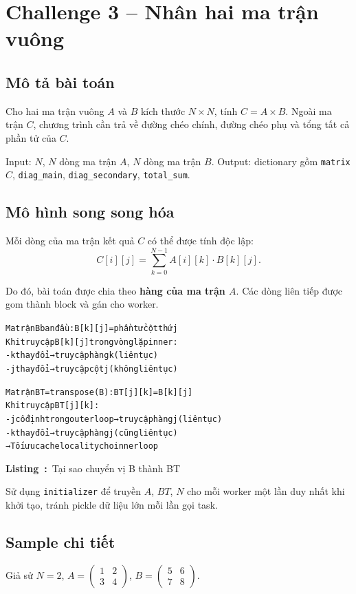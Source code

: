 \documentclass[12pt,a4paper]{article}
\newcounter{vietlisting}
\newenvironment{vietlisting}[1]{%
  \def\vietlistingcaption{#1}%
  \refstepcounter{vietlisting}%
  \begin{tcolorbox}[
    enhanced,
    breakable,
    colback=codebg,
    colframe=codeframe,
    boxrule=0.5pt,
    arc=1mm,
    left=6pt,
    right=6pt,
    top=6pt,
    bottom=4pt
  ]%
  \small\ttfamily\begin{alltt}
}{%
  \end{alltt}\normalfont
  \end{tcolorbox}%
  \begin{center}
    \small\textbf{Listing~\thevietlisting:}~\vietlistingcaption
  \end{center}
}
\begin{document}
\section{Challenge 3 -- Nhân hai ma trận vuông}

\subsection{Mô tả bài toán}

Cho hai ma trận vuông $A$ và $B$ kích thước $N \times N$, tính $C = A \times B$. Ngoài ma trận $C$, chương trình cần trả về đường chéo chính, đường chéo phụ và tổng tất cả phần tử của $C$.

Input: $N$, $N$ dòng ma trận $A$, $N$ dòng ma trận $B$. Output: dictionary gồm \texttt{matrix} $C$, \texttt{diag\_main}, \texttt{diag\_secondary}, \texttt{total\_sum}.

\subsection{Mô hình song song hóa}

Mỗi dòng của ma trận kết quả $C$ có thể được tính độc lập:
\[
C[i][j] = \sum_{k=0}^{N-1} A[i][k] \cdot B[k][j].
\]

Do đó, bài toán được chia theo \textbf{hàng của ma trận $A$}. Các dòng liên tiếp được gom thành block và gán cho worker.

\begin{vietlisting}{Tại sao chuyển vị B thành BT}
Ma trận B ban đầu: B[k][j] = phần tử cột thứ j
Khi truy cập B[k][j] trong vòng lặp inner:
  - k thay đổi → truy cập hàng k (liên tục)
  - j thay đổi → truy cập cột j (không liên tục)

Ma trận BT = transpose(B): BT[j][k] = B[k][j]
Khi truy cập BT[j][k]:
  - j cố định trong outer loop → truy cập hàng j (liên tục)
  - k thay đổi → truy cập hàng j (cũng liên tục)
  → Tối ưu cache locality cho inner loop
\end{vietlisting}

Sử dụng \texttt{initializer} để truyền $A$, $BT$, $N$ cho mỗi worker một lần duy nhất khi khởi tạo, tránh pickle dữ liệu lớn mỗi lần gọi task.

\subsection{Sample chi tiết}

Giả sử $N=2$, $A = \begin{pmatrix}1 & 2\\ 3 & 4\end{pmatrix}$, $B = \begin{pmatrix}5 & 6\\ 7 & 8\end{pmatrix}$.
\end{document}
